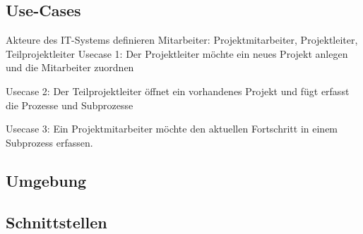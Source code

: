 \subsection{Use-Cases}
Akteure des IT-Systems definieren
Mitarbeiter: Projektmitarbeiter, Projektleiter, Teilprojektleiter
Usecase 1:
Der Projektleiter möchte ein neues Projekt anlegen und die Mitarbeiter zuordnen

Usecase 2:
Der Teilprojektleiter öffnet ein vorhandenes Projekt und fügt erfasst die Prozesse und Subprozesse

Usecase 3:
Ein Projektmitarbeiter möchte den aktuellen Fortschritt in einem Subprozess erfassen.

\subsection{Umgebung}
\subsection{Schnittstellen}